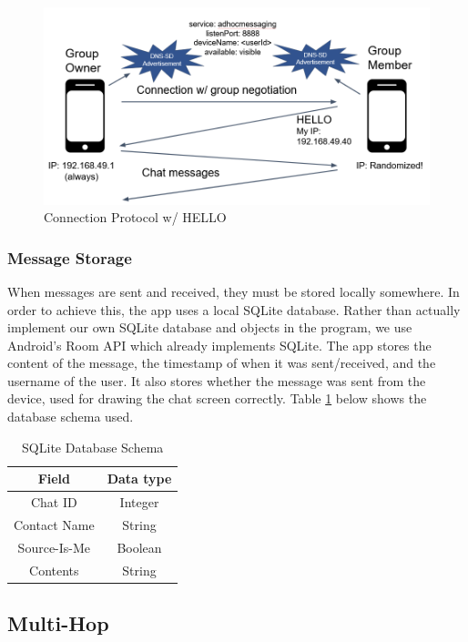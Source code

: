 \documentclass[10pt]{article}
\begin{document}
\begin{figure}[h]
    \centering
    \includegraphics[width=5in]{proto.png}
    \caption{Connection Protocol w/ HELLO}
    \label{backend:proto}
\end{figure}

\subsubsection{Message Storage}

When messages are sent and received, they must be stored locally somewhere. In order to achieve this, the app uses a local SQLite database. Rather than actually implement our own SQLite database and objects in the program, we use Android's Room API which already implements SQLite. The app stores the content of the message, the timestamp of when it was sent/received, and the username of the user. It also stores whether the message was sent from the device, used for drawing the chat screen correctly. Table \ref{backend:sqlite} below shows the database schema used. 

\begin{table}[h]
    \begin{center}
    \begin{tabular}{|c|c|} \hline
        Field & Data type \\ \hline
        Chat ID & Integer \\
        Contact Name & String \\
        Source-Is-Me & Boolean \\
        Contents & String \\ \hline
    \end{tabular}
    \end{center}
    \caption{SQLite Database Schema}
    \label{backend:sqlite}
\end{table}


\subsection{Multi-Hop}
\end{document}
